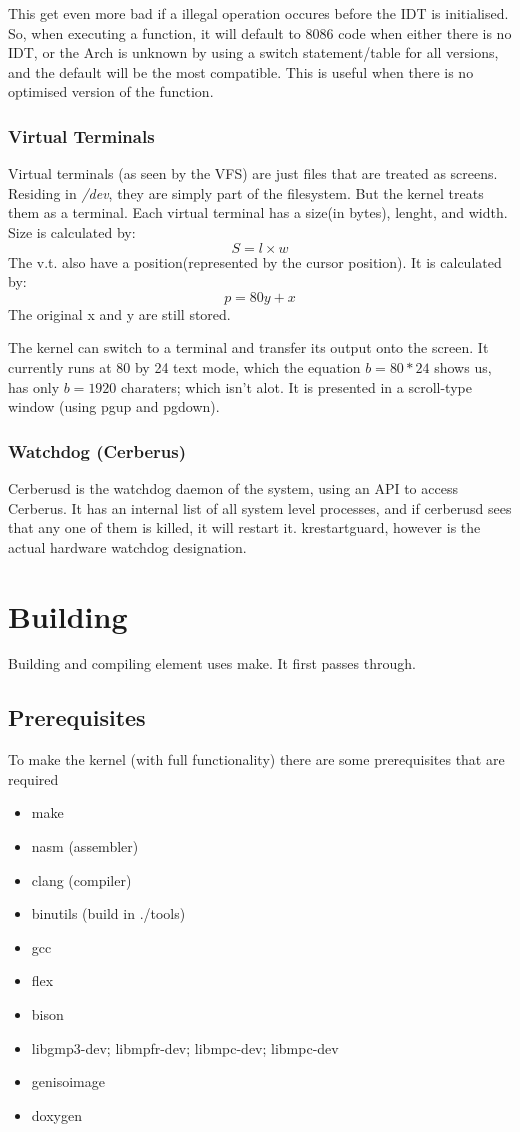 \documentclass[12pt]{article}
\begin{document}
This get even more bad if a illegal operation occures before the IDT is initialised. So, when executing a function, it will default to 8086 code when either there is no IDT, or the Arch is unknown by using a switch statement/table for all versions, and the default will be the most compatible. This is useful when there is no optimised version of the function.

\subsubsection{Virtual Terminals}
Virtual terminals (as seen by the VFS) are just files that are treated as screens. Residing in \emph{/dev}, they are simply part of the filesystem. But the kernel treats them as a terminal. Each virtual terminal has a size(in bytes), lenght, and width. 
Size is calculated by: 
\[S=l\times w\] 
The v.t. also have a position(represented by the cursor position). It is calculated by:
\[p=80y + x\]
The original x and y are still stored.

The kernel can switch to a terminal and transfer its output onto the screen. It currently runs at 80 by 24 text mode, which the equation \(b=80*24\) shows us, has only \(b=1920\) charaters; which isn't alot. It is presented in a scroll-type window (using pgup and pgdown).
\subsubsection{Watchdog (Cerberus)}
Cerberusd is the watchdog daemon of the system, using an API to access Cerberus. It has an internal list of all system level processes, and if cerberusd sees that any one of them is killed, it will restart it. krestartguard, however is the actual hardware watchdog designation.
\section{Building}
Building and compiling element uses make. It first passes through.
\subsection{Prerequisites}
To make the kernel (with full functionality) there are some prerequisites that are required
\begin{itemize}
	\item make 
	\item nasm (assembler)
	\item clang (compiler)
	\item binutils (build in ./tools)
	\item gcc
	\item flex
	\item bison
	\item libgmp3-dev; libmpfr-dev; libmpc-dev; libmpc-dev
	\item genisoimage 
	\item doxygen
\end{itemize}
\end{document}
